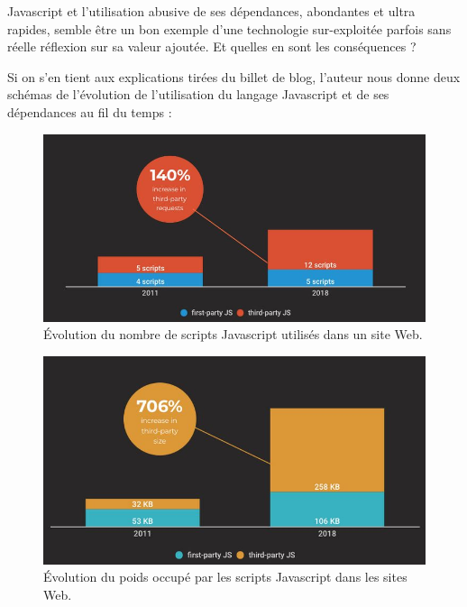 \documentclass[a4paper,12pt,twoside]{book}
\begin{document}
Javascript et l'utilisation abusive de ses dépendances, abondantes et ultra rapides, semble être un bon exemple d'une technologie sur-exploitée parfois sans réelle réflexion sur sa valeur ajoutée. Et quelles en sont les conséquences ?

Si on s'en tient aux explications tirées du billet de blog, l'auteur nous donne deux schémas de l'évolution de l'utilisation du langage Javascript et de ses dépendances au fil du temps :

\begin{figure}[H]
    \centering
    \includegraphics[width=12cm]{img/partie_3/scripts_js.JPG}
     \caption[Évolution du nombre de scripts Javascript utilisés dans un site Web]{Évolution du nombre de scripts Javascript utilisés dans un site Web.\footnotemark}
     \label{scripts_js}
\end{figure}

\begin{figure}[H]
    \centering
    \includegraphics[width=12cm]{img/partie_3/poids_js.JPG}
    \caption[Évolution du poids occupé par les scripts Javascript dans les sites Web]{Évolution du poids occupé par les scripts Javascript dans les sites Web.\footnotemark}
    \label{poids_js}
\end{figure}
\end{document}
